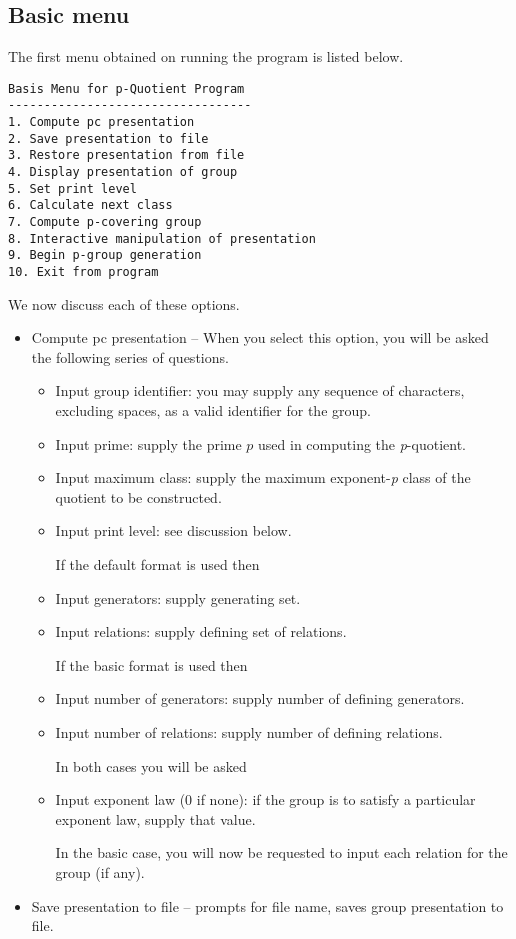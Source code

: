 \subsection{Basic menu}
The first menu obtained on running the program is listed below.
\begin{verbatim}
Basis Menu for p-Quotient Program
----------------------------------
1. Compute pc presentation
2. Save presentation to file
3. Restore presentation from file
4. Display presentation of group
5. Set print level
6. Calculate next class
7. Compute p-covering group
8. Interactive manipulation of presentation
9. Begin p-group generation
10. Exit from program

\end{verbatim}
We now discuss each of these options.
\begin{itemize}
\item Compute pc presentation -- 
When you select this option, you will be asked the following series
of questions.
\begin{itemize}
\item Input group identifier: you may supply any sequence of characters, 
excluding spaces, as a valid identifier for the group.
\item Input prime: supply the prime $p$ used in computing the {\it p}-quotient.
\item Input maximum class: supply the maximum exponent-{\it p} class of 
the quotient to be constructed.
\item Input print level: see discussion below.

If the default format is used then
\item Input generators: supply generating set. 
\item Input relations: supply defining set of relations.

If the basic format is used then 
\item Input number of generators: supply number of defining generators.
\item Input number of relations: supply number of defining relations.

In both cases you will be asked 
\item Input exponent law (0 if none): if the group is to satisfy a 
particular exponent law, supply that value.

In the basic case, you will now be requested to input each 
relation for the group (if any).
\end{itemize}

\item Save presentation to file -- prompts for file name, saves  
group presentation to file.


\end{itemize}
